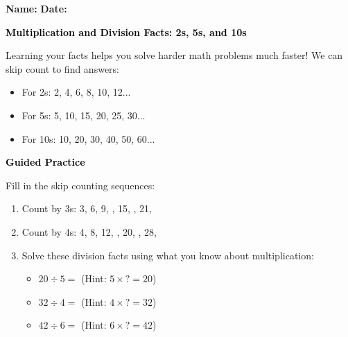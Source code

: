 \documentclass[12pt, letterpaper, fleqn]{article}
\newcommand{\blank}{\underline{\hspace{2.2cm}}}
\begin{document}
\textbf{Name:} \underline{\hspace{5cm}}
\hfill
\textbf{Date:} \underline{\hspace{3cm}}\\

\begin{tcolorbox}[colback=customteal!20]
    \large\textcolor{black}{\textbf{Multiplication and Division Facts: 2s, 5s, and 10s}}
\end{tcolorbox}

\vspace{3mm}
\noindent
Learning your facts helps you solve harder math problems much faster!
We can skip count to find answers:
\begin{itemize}
  \item For 2s: 2, 4, 6, 8, 10, 12...
  \item For 5s: 5, 10, 15, 20, 25, 30...
  \item For 10s: 10, 20, 30, 40, 50, 60...
\end{itemize}

\newpage
\begin{tcolorbox}[colback=customteal!20]
    \large\textcolor{black}{\textbf{Guided Practice}}
\end{tcolorbox}

\vspace{5mm}
\noindent
Fill in the skip counting sequences:

\vspace{5mm}
\begin{enumerate}[itemsep=2cm, leftmargin=0.6cm]
\item Count by 3s: 3, 6, 9, \blank, 15, \blank, 21, \blank
\item Count by 4s: 4, 8, 12, \blank, 20, \blank, 28, \blank
\item Solve these division facts using what you know about multiplication:
\begin{itemize}[itemsep=0.8cm]
  \item $20 \div 5 =$ \blank \quad (Hint: $5 \times \textsf{?} = 20$)
  \item $32 \div 4 =$ \blank \quad (Hint: $4 \times \textsf{?} = 32$)
  \item $42 \div 6 =$ \blank \quad (Hint: $6 \times \textsf{?} = 42$)
\end{itemize}
\end{enumerate}
\end{document}
